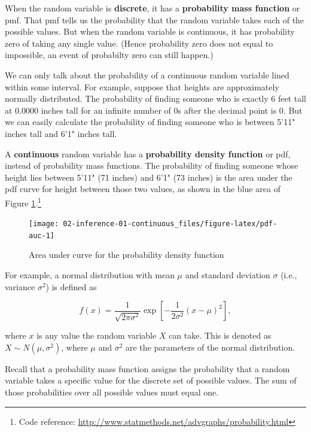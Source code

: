 \documentclass[]{book}
\let\rmarkdownfootnote\footnote%
\def\footnote{\protect\rmarkdownfootnote}
\theoremstyle{definition}
\theoremstyle{definition}
\theoremstyle{definition}
\theoremstyle{remark}
\begin{document}
When the random variable is \textbf{discrete}, it has a
\textbf{probability mass function} or pmf. That pmf tells us the
probability that the random variable takes each of the possible values.
But when the random variable is continuous, it has probability zero of
taking any single value. (Hence probability zero does not equal to
impossible, an event of probabilty zero can still happen.)

We can only talk about the probability of a continuous random variable
lined within some interval. For example, suppose that heights are
approximately normally distributed. The probability of finding someone
who is exactly 6 feet tall at 0.0000 inches tall for an infinite number
of 0s after the decimal point is 0. But we can easily calculate the
probability of finding someone who is between 5'11" inches tall and 6'1"
inches tall.

A \textbf{continuous} random variable has a \textbf{probability density
function} or pdf, instead of probability mass functions. The probability
of finding someone whose height lies between 5'11" (71 inches) and 6'1"
(73 inches) is the area under the pdf curve for height between those two
values, as shown in the blue area of Figure \ref{fig:pdf-auc}.\footnote{Code
  reference: \url{http://www.statmethods.net/advgraphs/probability.html}}

\begin{figure}

{\centering \texttt{[image: 02-inference-01-continuous\_files/figure-latex/pdf-auc-1]} 

}

\caption{Area under curve for the probability density function}\label{fig:pdf-auc}
\end{figure}

For example, a normal distribution with mean \(\mu\) and standard
deviation \(\sigma\) (i.e., variance \(\sigma^2\)) is defined as

\[f(x) = \frac{1}{\sqrt{2 \pi \sigma^2}} \exp[-\frac{1}{2\sigma^2}(x-\mu)^2],\]

where \(x\) is any value the random variable \(X\) can take. This is
denoted as \(X \sim N(\mu,\sigma^2)\), where \(\mu\) and \(\sigma^2\)
are the parameters of the normal distribution.

Recall that a probability mass function assigns the probability that a
random variable takes a specific value for the discrete set of possible
values. The sum of those probabilities over all possible values must
equal one.
\end{document}
